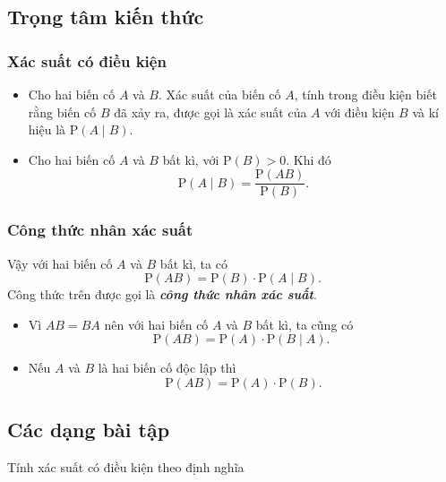 \subsection{Trọng tâm kiến thức}
\begin{tomtat}
	\subsubsection{Xác suất có điều kiện}
	\begin{boxdn}
	\begin{itemize}
	\item
	Cho hai biến cố $A$ và $B$. Xác suất của biến cố $A$, tính trong điều kiện biết rằng biến cố $B$ đã xảy ra, được gọi là xác suất của $A$ với điều kiện $B$ và kí hiệu là $\mathrm{P}(A\mid B)$.
	\item
	Cho hai biến cố $A$ và $B$ bất kì, với $\mathrm{P}(B)>0$. Khi đó
	$$\mathrm{P}(A \mid B)=\dfrac{\mathrm{P}(A B)}{\mathrm{P}(B)}.$$
	\end{itemize}
	\end{boxdn}
	\subsubsection{Công thức nhân xác suất}
	\begin{boxdn}
	Vậy với hai biến cố $A$ và $B$ bất kì, ta có
	$$\mathrm{P}(A B)=\mathrm{P}(B) \cdot \mathrm{P}(A \mid B).$$
	Công thức trên được gọi là \textbf{\textit{công thức nhân xác suất}}.
	\end{boxdn}
	\begin{note}
	\begin{itemize}
	\item Vì $AB=BA$ nên với hai biến cố $A$ và $B$ bất kì, ta cũng có
	$$\mathrm{P}(A B)=\mathrm{P}(A) \cdot \mathrm{P}(B \mid A) \text{. }$$
	\item Nếu $A$ và $B$ là hai biến cố độc lập thì
	$$\mathrm{P}(A B)=\mathrm{P}(A) \cdot \mathrm{P}(B).$$
	\end{itemize}
	\end{note}
\end{tomtat}
\subsection{Các dạng bài tập}
\begin{dang}{Tính xác suất có điều kiện theo định nghĩa}
\end{dang}

